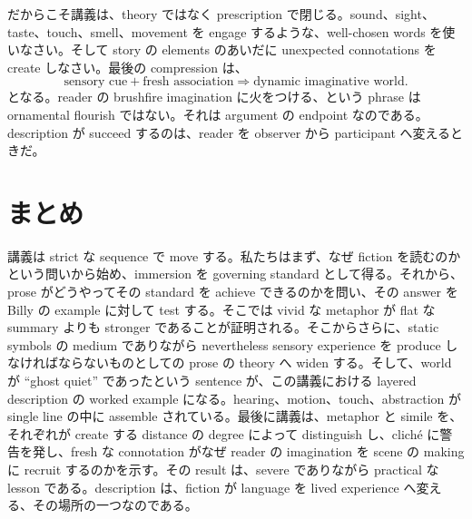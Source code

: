 だからこそ講義は、theory ではなく prescription で閉じる。sound、sight、taste、touch、smell、movement を engage するような、well-chosen words を使いなさい。そして story の elements のあいだに unexpected connotations を create しなさい。最後の compression は、
\begin{equation}
\text{sensory cue} + \text{fresh association} \Rightarrow \text{dynamic imaginative world}.
\end{equation}
となる。reader の brushfire imagination に火をつける、という phrase は ornamental flourish ではない。それは argument の endpoint なのである。description が succeed するのは、reader を observer から participant へ変えるときだ。

\section{まとめ}

講義は strict な sequence で move する。私たちはまず、なぜ fiction を読むのかという問いから始め、immersion を governing standard として得る。それから、prose がどうやってその standard を achieve できるのかを問い、その answer を Billy の example に対して test する。そこでは vivid な metaphor が flat な summary よりも stronger であることが証明される。そこからさらに、static symbols の medium でありながら nevertheless sensory experience を produce しなければならないものとしての prose の theory へ widen する。そして、world が ``ghost quiet'' であったという sentence が、この講義における layered description の worked example になる。hearing、motion、touch、abstraction が single line の中に assemble されている。最後に講義は、metaphor と simile を、それぞれが create する distance の degree によって distinguish し、clich\'e に警告を発し、fresh な connotation がなぜ reader の imagination を scene の making に recruit するのかを示す。その result は、severe でありながら practical な lesson である。description は、fiction が language を lived experience へ変える、その場所の一つなのである。